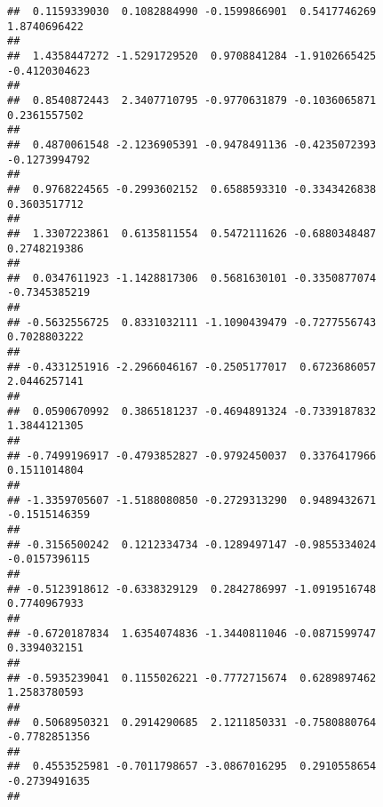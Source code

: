 \documentclass[]{article}
\begin{document}
\begin{verbatim}
##  0.1159339030  0.1082884990 -0.1599866901  0.5417746269  1.8740696422 
##                                                                       
##  1.4358447272 -1.5291729520  0.9708841284 -1.9102665425 -0.4120304623 
##                                                                       
##  0.8540872443  2.3407710795 -0.9770631879 -0.1036065871  0.2361557502 
##                                                                       
##  0.4870061548 -2.1236905391 -0.9478491136 -0.4235072393 -0.1273994792 
##                                                                       
##  0.9768224565 -0.2993602152  0.6588593310 -0.3343426838  0.3603517712 
##                                                                       
##  1.3307223861  0.6135811554  0.5472111626 -0.6880348487  0.2748219386 
##                                                                       
##  0.0347611923 -1.1428817306  0.5681630101 -0.3350877074 -0.7345385219 
##                                                                       
## -0.5632556725  0.8331032111 -1.1090439479 -0.7277556743  0.7028803222 
##                                                                       
## -0.4331251916 -2.2966046167 -0.2505177017  0.6723686057  2.0446257141 
##                                                                       
##  0.0590670992  0.3865181237 -0.4694891324 -0.7339187832  1.3844121305 
##                                                                       
## -0.7499196917 -0.4793852827 -0.9792450037  0.3376417966  0.1511014804 
##                                                                       
## -1.3359705607 -1.5188080850 -0.2729313290  0.9489432671 -0.1515146359 
##                                                                       
## -0.3156500242  0.1212334734 -0.1289497147 -0.9855334024 -0.0157396115 
##                                                                       
## -0.5123918612 -0.6338329129  0.2842786997 -1.0919516748  0.7740967933 
##                                                                       
## -0.6720187834  1.6354074836 -1.3440811046 -0.0871599747  0.3394032151 
##                                                                       
## -0.5935239041  0.1155026221 -0.7772715674  0.6289897462  1.2583780593 
##                                                                       
##  0.5068950321  0.2914290685  2.1211850331 -0.7580880764 -0.7782851356 
##                                                                       
##  0.4553525981 -0.7011798657 -3.0867016295  0.2910558654 -0.2739491635 
##                                                                       

\end{verbatim}
\end{document}
